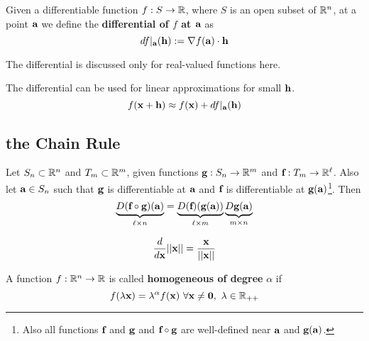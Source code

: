 \documentclass[11pt]{article}
\newcommand{\vex}[0]{\ve{x}}
\newcommand{\vea}[0]{\ve{a}}
\newcommand{\vef}[0]{\ve{f}}
\newcommand{\veg}[0]{\ve{g}}
\begin{document}
			\begin{definition}
				Given a differentiable function $f: S \to \mathbb{R}$, where $S$ is an open subset of $\mathbb{R}^n$, at a point $\vea$ we define the \textbf{differential of $f$ at $\vea$} as 
				\begin{equation}
					df|_{\vea}(\ve{h}) := \nabla f(\vea) \cdot \ve{h}
				\end{equation}
			\end{definition}
			
			\begin{remark}
				The differential is discussed only for real-valued functions here.
			\end{remark}
			
			\begin{remark}
				The differential can be used for linear approximations for small $\textbf{h}$.
				\begin{equation}
					f(\vex + \ve{h}) \approx f(\vex) + df|_{\vea}(\ve{h})
				\end{equation}
			\end{remark}
			
		\subsection{the Chain Rule}
			\begin{theorem}
				Let $S_n \subset \mathbb{R}^n$ and $T_m \subset \mathbb{R}^m$, given functions $\veg: S_n \to \R^m$ and $\vef: T_m \to \R^{\ell}$. Also let $\vea \in S_n$ such that $\veg$ is differentiable at $\vea$ and $\vef$ is differentiable at $\veg(\vea)$\footnote{Also all functions $\vef$ and $\veg$ and $\vef \circ \veg$ are well-defined near $\vea$ and $\veg(\vea)$.}. Then
				\begin{equation}
					\underbrace{D(\vef \circ \veg)(\vea)}_{\ell \times n} 
					= \underbrace{D(\vef)(\veg(\vea))}_{\ell \times m} \underbrace{D\veg(\vea)}_{m \times n}
				\end{equation}
			\end{theorem}
			
			\begin{example}
				\begin{equation}
					\frac{d}{d\vex} \norm{\vex} = \frac{\vex}{\norm{\vex}}
				\end{equation}
			\end{example}
			
			\begin{definition}
				A function $f: \mathbb{R}^n \to \mathbb{R}$ is called \textbf{homogeneous of degree} $\alpha$ if
				\begin{equation}
					f(\lambda \vex) = \lambda^\alpha f(\vex)\ \forall \vex \neq \ve{0},\ \lambda \in \R_{++}
				\end{equation}
			\end{definition}
			
\end{document}
